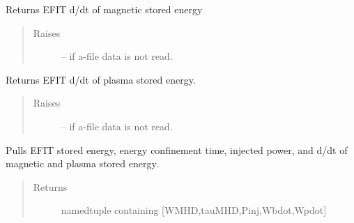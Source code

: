 \documentclass[letterpaper,10pt,english]{sphinxmanual}
\begin{document}
\begin{fulllineitems}
\begin{fulllineitems}
\begin{quote}
\begin{description}
\end{description}\end{quote}

\end{fulllineitems}


\begin{fulllineitems}
\label{eqtools:eqtools.eqdskreader.EqdskReader.getWbdot}
Returns EFIT d/dt of magnetic stored energy
\begin{quote}\begin{description}
\item[{Raises }] \leavevmode
{} -- 
if a-file data is not read.

\end{description}\end{quote}

\end{fulllineitems}


\begin{fulllineitems}
\label{eqtools:eqtools.eqdskreader.EqdskReader.getWpdot}
Returns EFIT d/dt of plasma stored energy.
\begin{quote}\begin{description}
\item[{Raises }] \leavevmode
{} -- 
if a-file data is not read.

\end{description}\end{quote}

\end{fulllineitems}


\begin{fulllineitems}
\label{eqtools:eqtools.eqdskreader.EqdskReader.getEnergy}
Pulls EFIT stored energy, energy confinement time, injected power, and d/dt of magnetic and plasma stored energy.
\begin{quote}\begin{description}
\item[{Returns}] \leavevmode
namedtuple containing {[}WMHD,tauMHD,Pinj,Wbdot,Wpdot{]}


\end{description}
\end{quote}
\end{fulllineitems}
\end{fulllineitems}
\end{document}

